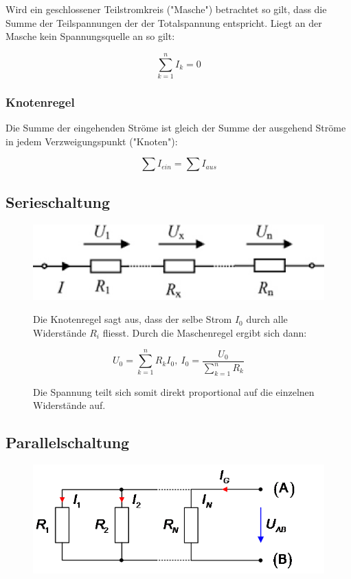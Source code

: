 \documentclass[a4paper,12pt]{article}
\begin{document}
Wird ein geschlossener Teilstromkreis ("Masche") betrachtet so gilt, dass die Summe der 
Teilspannungen der der Totalspannung entspricht. Liegt an der Masche kein Spannungsquelle an so
gilt:

\[\sum_{k = 1}^{n} I_k = 0 \]


\subsubsection{Knotenregel}

Die Summe der eingehenden Ströme ist gleich der Summe der ausgehend Ströme in jedem 
Verzweigungspunkt ("Knoten"):

\[\sum I_{ein} = \sum I_{aus}\]


\subsection{Serieschaltung}

\begin{figure}[H]

\includegraphics[width=.4\textwidth]{media/SerieschaltFert.png}

Die Knotenregel sagt aus, dass der selbe Strom $I_0$ durch alle Widerstände $R_i$ fliesst. Durch
die Maschenregel ergibt sich dann:

\[U_0 = \sum_{k=1}^{n} R_k I_0 ,\ I_0 = \frac{U_0}{\sum_{k=1}^{n} R_k }\] 

Die Spannung teilt sich somit direkt proportional auf die einzelnen Widerstände auf.

\end{figure}

\newpage

\subsection{Parallelschaltung}

\begin{figure}[H]

\includegraphics[width=.4\textwidth]{media/ParallelschaltungFert.png}

\end{figure}
\end{document}
